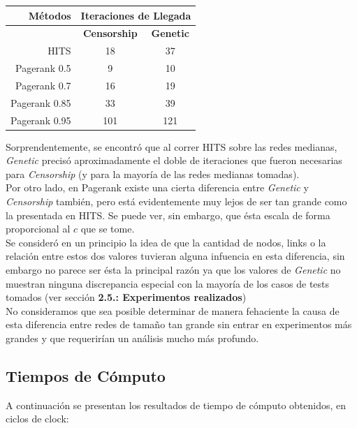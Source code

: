\documentclass[a4paper]{article}
\begin{document}
\begin{center}
\begin{tabular}{r|c|c}
\textbf{Métodos} &  \multicolumn{2}{|c}{\textbf{Iteraciones de Llegada}}\\
\hline
  &  \textbf{Censorship} & \textbf{Genetic}\\ 
\hline
HITS & 18 & 37\\
\hline
Pagerank 0.5 & 9 & 10\\
\hline
Pagerank 0.7 & 16 & 19\\
\hline
Pagerank 0.85 & 33 & 39\\
\hline
Pagerank 0.95 & 101 & 121\\
\end{tabular}
\end{center}

Sorprendentemente, se encontró que al correr HITS sobre las redes medianas, \textit{Genetic} precisó aproximadamente el doble de iteraciones que fueron necesarias para \textit{Censorship} (y para la mayoría de las redes medianas tomadas).\\

Por otro lado, en Pagerank existe una cierta diferencia entre \textit{Genetic} y \textit{Censorship} también, pero está evidentemente muy lejos de ser tan grande como la presentada en HITS. Se puede ver, sin embargo, que ésta escala de forma proporcional al $c$ que se tome.\\

Se consideró en un principio la idea de que la cantidad de nodos, links o la relación entre estos dos valores tuvieran alguna infuencia en esta diferencia, sin embargo no parece ser ésta la principal razón ya que los valores de \textit{Genetic} no muestran ninguna discrepancia especial con la mayoría de los casos de tests tomados (ver sección \textbf{2.5.: Experimentos realizados})\\

No consideramos que sea posible determinar de manera fehaciente la causa de esta diferencia entre redes de tamaño tan grande sin entrar en experimentos más grandes y que requerirían un análisis mucho más profundo.

\subsection{Tiempos de Cómputo}

A continuación se presentan los resultados de tiempo de cómputo obtenidos, en ciclos de clock:
\end{document}
